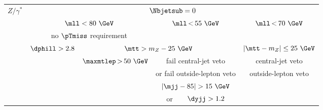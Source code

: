\begin{tabular}{c|| c | c | c | c}
    \midrule
    \multirow{8}{*}{$Z/\gamma^{\ast}$}  & \multicolumn{4}{c}{\phantom{ccccc}$\Nbjetsub=0$}                                                                                                                                       \\ \cline{2-5}
                                        & \multicolumn{2}{c|}{\phantom{ccccc}$\mll < 80~\GeV$} & $\mll\,{<}\,55~\GeV$                                          & $\mll\,{<}\,70~\GeV$                                            \\\
                                        & \multicolumn{2}{c|}{no $\pTmiss$ requirement}        &                                                               &                                                                 \\\cline{2-4}
                                        & $\dphill > 2.8$                                      & \multicolumn{2}{c|}{$\mtt > m_Z - 25~\GeV$}                   & $|\mtt - m_Z| \leq 25~\GeV$                                     \\ \cline{3-4}
                                        &                                                      & $\maxmtlep\,{>}\,50~\GeV$                                     & fail central-jet veto          & central-jet veto               \\
                                        &                                                      &                                                               & or fail outside-lepton veto    & outside-lepton veto            \\ \cline{4-4}
                                        &                                                      &                                                               & $|\mjj-85| > 15~\GeV$          &                                \\
                                        &                                                      &                                                               & or\ \ \ \ $\dyjj > 1.2$        &                                \\
    \bottomrule
\end{tabular}
